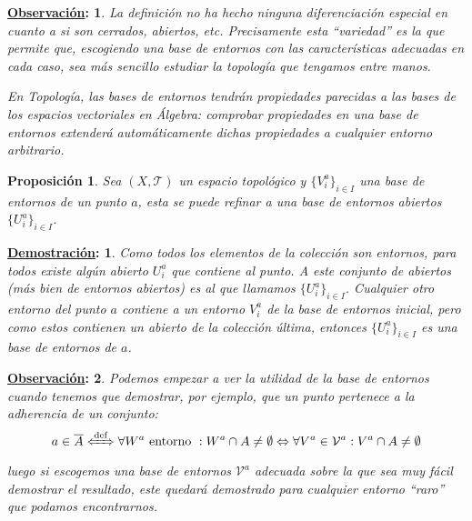 \documentclass[10pt,a4paper,openright]{book}
\theoremstyle{break}
\newtheorem*{prop}{Proposición}
\newtheorem*{demo}{\underline{Demostración}:}
\newtheorem*{obs}{\underline{Observación}:}
\begin{document}
\begin{obs}
La definición no ha hecho ninguna diferenciación especial en cuanto a si son cerrados, abiertos, etc. Precisamente esta ``variedad'' es la que permite que, escogiendo una base de entornos con las características adecuadas en cada caso, sea más sencillo estudiar la topología que tengamos entre manos.

En Topología, las bases de entornos tendrán propiedades parecidas a las bases de los espacios vectoriales en Álgebra: comprobar propiedades en una base de entornos extenderá automáticamente dichas propiedades a cualquier entorno arbitrario.
\end{obs}

\begin{prop}
Sea $(X,\mathcal{T})$ un espacio topológico y $\{V_i^a \}_{i\in I}$ una base de entornos de un punto $a$, esta se puede refinar a una base de entornos abiertos $\{U_i^a\}_{i\in I}$. 
\end{prop}
\begin{demo}    
Como todos los elementos de la colección son entornos, para todos existe algún abierto $U_i^a$ que contiene al punto. A este conjunto de abiertos (más bien de entornos abiertos) es al que llamamos $\{U_i^a\}_{i\in I}$. Cualquier otro entorno del punto $a$ contiene a un entorno $V_i^a$ de la base de entornos inicial, pero como estos contienen un abierto de la colección última, entonces $\{U_i^a\}_{i\in I}$ es una base de entornos de  $a$.
\end{demo}

\begin{obs}    
Podemos empezar a ver la utilidad de la base de entornos cuando tenemos que demostrar, por ejemplo, que un punto pertenece a la adherencia de un conjunto:
$$
a \in \overline{A} \xLeftrightarrow{\text{def}} \forall W^a \text{ entorno }: W^a \cap A \neq \emptyset \Leftrightarrow \forall V^a \in \mathcal{V}^a: V^a\cap A \neq \emptyset
$$
luego si escogemos una base de entornos $\mathcal{V}^a$ adecuada sobre la que sea muy fácil demostrar el resultado, este quedará demostrado para cualquier entorno ``raro'' que podamos encontrarnos.
\end{obs}
\end{document}
